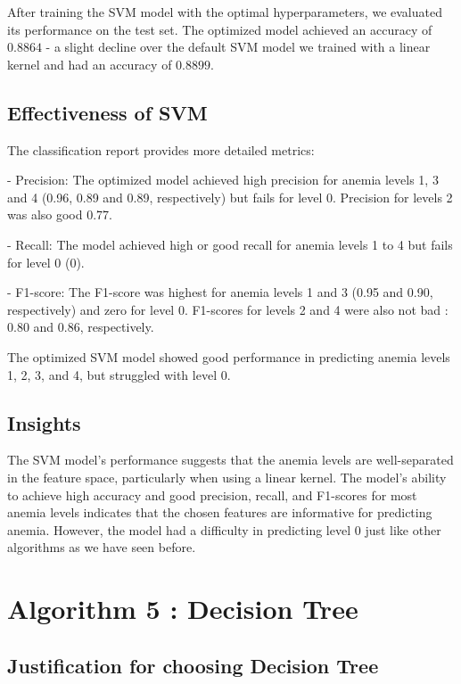 After training the SVM model with the optimal hyperparameters, we evaluated its performance on the test set. The optimized model achieved an accuracy of $0.8864$ - a slight decline over the default SVM model we trained with a linear kernel and had an accuracy of $0.8899$.


\subsection{Effectiveness of SVM}


The classification report provides more detailed metrics:

- Precision: The optimized model achieved high precision for anemia levels 1, 3 and 4 (0.96, 0.89 and 0.89, respectively) but fails for level 0. Precision for levels 2 was also good 0.77.

- Recall: The model achieved high or good recall for anemia levels 1 to 4 but fails for level 0 (0).

- F1-score: The F1-score was highest for anemia levels 1 and 3 (0.95 and 0.90, respectively) and zero for level 0. F1-scores for levels 2 and 4 were also not bad : 0.80 and 0.86, respectively.

The optimized SVM model showed good performance in predicting anemia levels 1, 2, 3, and 4, but struggled with level 0.

\subsection{Insights }

The SVM model's performance suggests that the anemia levels are well-separated in the feature space, particularly when using a linear kernel. The model's ability to achieve high accuracy and good precision, recall, and F1-scores for most anemia levels indicates that the chosen features are informative for predicting anemia. However, the model had a difficulty in predicting level 0 just like other algorithms as we have seen before.

\section{Algorithm 5 : Decision Tree}

\subsection{Justification for choosing Decision Tree}


